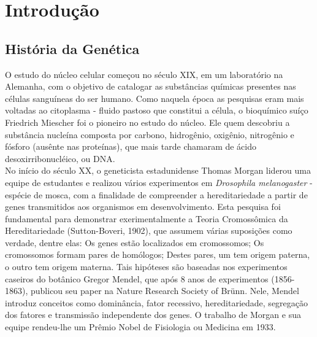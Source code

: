 \chapter{Introdução}

\section{História da Genética}

\indent O estudo do núcleo celular começou no século XIX, em um laboratório na Alemanha, com o objetivo de catalogar as substâncias químicas presentes nas células sanguíneas do ser humano. Como naquela época as pesquisas eram mais voltadas ao citoplasma - fluido pastoso que constitui a célula, o bioquímico suíço Friedrich Miescher foi o pioneiro no estudo do núcleo. Ele quem descobriu a substância nucleína composta por carbono, hidrogênio, oxigênio, nitrogênio e fósforo (ausênte nas proteínas), que mais tarde chamaram de ácido desoxirribonucléico, ou DNA. \\

\indent No início do século XX, o geneticista estadunidense Thomas Morgan liderou uma equipe de estudantes e realizou vários experimentos em \textit{Drosophila melanogaster} - espécie de mosca, com a finalidade de compreender a hereditariedade a partir de genes transmitidos aos organismos em desenvolvimento. Esta pesquisa foi fundamental para demonstrar exerimentalmente a Teoria Cromossômica da Hereditariedade (Sutton-Boveri, 1902), que assumem várias suposições como verdade, dentre elas: Os genes estão localizados em cromossomos; Os cromossomos formam pares de homólogos; Destes pares, um tem origem paterna, o outro tem origem materna. Tais hipóteses são baseadas nos experimentos caseiros do botânico Gregor Mendel, que após 8 anos de experimentos (1856-1863), publicou seu paper na Nature Research Society of Brünn. Nele, Mendel introduz conceitos como dominância, fator recessivo, hereditariedade, segregação dos fatores e transmissão independente dos genes. O trabalho de Morgan e sua equipe rendeu-lhe um Prêmio Nobel de Fisiologia ou Medicina em 1933. \\

